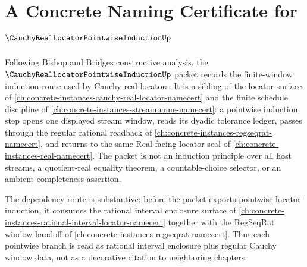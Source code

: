 \chapter{A Concrete Naming Certificate for $\CauchyRealLocatorPointwiseInductionUp$}
\label{ch:concrete-instances-cauchy-real-locator-pointwise-induction-namecert}

Following Bishop and Bridges constructive analysis, the
$\CauchyRealLocatorPointwiseInductionUp$ packet records the finite-window
induction route used by Cauchy real locators. It is a sibling of the locator
surface of \autoref{ch:concrete-instances-cauchy-real-locator-namecert} and
the finite schedule discipline of
\autoref{ch:concrete-instances-streamname-namecert}: a pointwise induction
step opens one displayed stream window, reads its dyadic tolerance ledger,
passes through the regular rational readback of
\autoref{ch:concrete-instances-regseqrat-namecert}, and returns to the same
Real-facing locator seal of \autoref{ch:concrete-instances-real-namecert}. The
packet is not an induction principle over all host streams, a quotient-real
equality theorem, a countable-choice selector, or an ambient completeness
assertion.

The dependency route is substantive: before the packet exports pointwise
locator induction, it consumes the rational interval enclosure surface of
\autoref{ch:concrete-instances-rational-interval-locator-namecert} together
with the RegSeqRat window handoff of
\autoref{ch:concrete-instances-regseqrat-namecert}. Thus each pointwise
branch is read as rational interval enclosure plus regular Cauchy window data,
not as a decorative citation to neighboring chapters.

